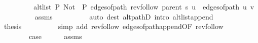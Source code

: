 \begin{isabellebody}
\ \ \ \ \ \ \isamarkupfalse%
\ \isamarkupfalse%
\ {\isachardoublequoteopen}alt{\isacharunderscore}{\kern0pt}list\ P{\isacharprime}{\kern0pt}{\isacharprime}{\kern0pt}\ {\isacharparenleft}{\kern0pt}Not\ {\isasymcirc}\ P{\isacharprime}{\kern0pt}{\isacharprime}{\kern0pt}{\isacharparenright}{\kern0pt}\ {\isacharparenleft}{\kern0pt}edges{\isacharunderscore}{\kern0pt}of{\isacharunderscore}{\kern0pt}path\ {\isacharparenleft}{\kern0pt}rev{\isacharunderscore}{\kern0pt}follow\ {\isacharparenleft}{\kern0pt}parent\ s{\isacharparenright}{\kern0pt}\ u{\isacharparenright}{\kern0pt}\ {\isacharat}{\kern0pt}\ edges{\isacharunderscore}{\kern0pt}of{\isacharunderscore}{\kern0pt}path\ {\isacharbrackleft}{\kern0pt}u{\isacharcomma}{\kern0pt}\ v{\isacharbrackright}{\kern0pt}{\isacharparenright}{\kern0pt}{\isachardoublequoteclose}\isanewline
\ \ \ \ \ \ \ \ \isamarkupfalse%
\ assms{\isacharparenleft}{\kern0pt}{}{\isacharparenright}{\kern0pt}\isanewline
\ \ \ \ \ \ \ \ \isamarkupfalse%
\ {\isacharparenleft}{\kern0pt}auto\ dest{\isacharcolon}{\kern0pt}\ alt{\isacharunderscore}{\kern0pt}pathD{\isacharparenleft}{\kern0pt}{}{\isacharparenright}{\kern0pt}\ intro{\isacharcolon}{\kern0pt}\ alt{\isacharunderscore}{\kern0pt}list{\isacharunderscore}{\kern0pt}append{\isacharunderscore}{\kern0pt}{}{\isacharprime}{\kern0pt}{\isacharparenright}{\kern0pt}\isanewline
\ \ \ \ \ \ \isamarkupfalse%
\ {\isacharquery}{\kern0pt}thesis\isanewline
\ \ \ \ \ \ \ \ \isamarkupfalse%
\ {\isacharparenleft}{\kern0pt}simp\ add{\isacharcolon}{\kern0pt}\ rev{\isacharunderscore}{\kern0pt}follow{\isacharparenleft}{\kern0pt}{}{\isacharparenright}{\kern0pt}\ edges{\isacharunderscore}{\kern0pt}of{\isacharunderscore}{\kern0pt}path{\isacharunderscore}{\kern0pt}append{\isacharunderscore}{\kern0pt}{}{\isacharbrackleft}{\kern0pt}OF\ rev{\isacharunderscore}{\kern0pt}follow{\isacharparenleft}{\kern0pt}{}{\isacharparenright}{\kern0pt}{\isacharbrackright}{\kern0pt}{\isacharparenright}{\kern0pt}\isanewline
\ \ \ \ \isamarkupfalse%
\isanewline
\ \ \isamarkupfalse%
\isanewline
{}\isamarkupfalse%
\isanewline
\ \ \isamarkupfalse%
\ {}\isanewline
\ \ \isamarkupfalse%
\ {\isacharquery}{\kern0pt}case\isanewline
\ \ \ \ \isamarkupfalse%
\ assms{\isacharparenleft}{\kern0pt}{}{\isacharcomma}{\kern0pt}\ {}{\isacharparenright}{\kern0pt}\isanewline

\end{isabellebody}
